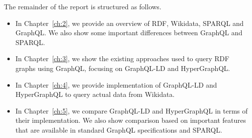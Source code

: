 The remainder of the report is structured as follows.
\begin{itemize}
	\item In Chapter~\ref{ch:2}, we provide an overview of RDF, Wikidata, SPARQL and GraphQL. We also show some important differences between GraphQL and SPARQL. 
	\item In Chapter~\ref{ch:3}, we show the existing approaches used to query RDF graphs using GraphQL, focusing on GraphQL-LD and HyperGraphQL.
	\item In Chapter~\ref{ch:4}, we provide implementation of GraphQL-LD and HyperGraphQL to query actual data from Wikidata.
	\item In Chapter~\ref{ch:5}, we compare GraphQL-LD and HyperGraphQL in terms of their implementation. We also show comparison based on important features that are available in standard GraphQL specifications and SPARQL.
\end{itemize}